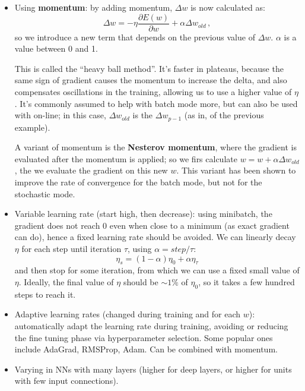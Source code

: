 \begin{itemize}
    \item Using \textbf{momentum}: by adding momentum, $\Delta w$ is now calculated as:
    \begin{equation*}
        \Delta w = - \eta \dfrac{\partial E(w)}{\partial w} + \alpha \Delta w_{old} \, ,
    \end{equation*}
    so we introduce a new term that depends on the previous value of $\Delta w$. $\alpha$ is a value between 0 and 1.

    This is called the ``heavy ball method''. It's faster in plateaus, because the same sign of gradient causes the momentum to increase the delta, and also compensates oscillations in the training, allowing us to use a higher value of $\eta$. It's commonly assumed to help with batch mode more, but can also be used with on-line; in this case, $\Delta w_{old}$ is the $\Delta w_{p-1}$ (as in, of the previous example).

    A variant of momentum is the \textbf{Nesterov momentum}, where the gradient is evaluated after the momentum is applied; so we firs calculate $w = w + \alpha \Delta w_{old}$, the we evaluate the gradient on this new $w$. This variant has been shown to improve the rate of convergence for the batch mode, but not for the stochastic mode.
    
    \item Variable learning rate (start high, then decrease):
    using minibatch, the gradient does not reach 0 even when close to a minimum (as exact gradient can do), hence a fixed learning rate should be avoided. We can linearly decay $\eta$ for each step until iteration $\tau$, using $\alpha = step / \tau$:
    \begin{equation*}
        \eta_s = (1-\alpha)\eta_0 + \alpha \eta_{\tau} 
    \end{equation*}
    and then stop for some iteration, from which we can use a fixed small value of $\eta$. Ideally, the final value of $\eta$ should be $\sim 1\%$ of $\eta_0$, so it takes a few hundred steps to reach it.
    
    \item Adaptive learning rates (changed during training and for each $w$): automatically adapt the learning rate during training, avoiding or reducing the fine tuning phase via hyperparameter selection. Some popular ones include AdaGrad, RMSProp, Adam. Can be combined with momentum.
    
    \item Varying in NNs with many layers (higher for deep layers, or higher for units with few input connections).
\end{itemize}

